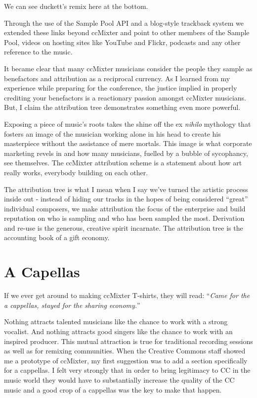 We can see duckett's remix here at the bottom.

Through the use of the Sample Pool API and a blog-style trackback system we
extended these links beyond ccMixter and point to other members of the Sample
Pool, videos on hosting sites like YouTube and F\hbox{}lickr, podcasts and any other
reference to the music.

It became clear that many ccMixter musicians consider the people they sample as
benefactors and attribution as a reciprocal currency. As I learned from my
experience while preparing for the conference, the justice implied in properly
crediting your benefactors is a reactionary passion amongst ccMixter musicians.
But, I claim the attribution tree demonstrates something even more powerful.

Exposing a piece of music's roots takes the shine of\hbox{}f the ex \textit{nihilo}
mythology that fosters an image of the musician working alone in his head to
create his masterpiece without the assistance of mere mortals. This image is
what corporate marketing revels in and how many musicians, fuelled by a bubble
of sycophancy, see themselves. The ccMixter attribution scheme is a statement
about how art really works, everybody building on each other.

The attribution tree is what I mean when I say we've turned the artistic process
inside out - instead of hiding our tracks in the hopes of being considered
``great'' individual composers, we make attribution the focus of the enterprise
and build reputation on who is sampling and who has been sampled the most.
Derivation and re-use is the generous, creative spirit incarnate. The
attribution tree is the accounting book of a gift economy.


\section{A Capellas}
\label{s:unexpected_collaboration:a_capellas}

If we ever get around to making ccMixter T-shirts, they will read:
``\textit{Came for the a cappellas, stayed for the sharing economy.}''

Nothing attracts talented musicians like the chance to work with a strong
vocalist. And nothing attracts good singers like the chance to work with an
inspired producer. This mutual attraction is true for traditional recording
sessions as well as for remixing communities. When the Creative Commons staf\hbox{}f
showed me a prototype of ccMixter, my f\hbox{}irst suggestion was to add a section
specif\hbox{}ically for a cappellas. I felt very strongly that in order to bring
legitimacy to CC in the music world they would have to substantially increase
the quality of the CC music and a good crop of a cappellas was the key to make
that happen.


